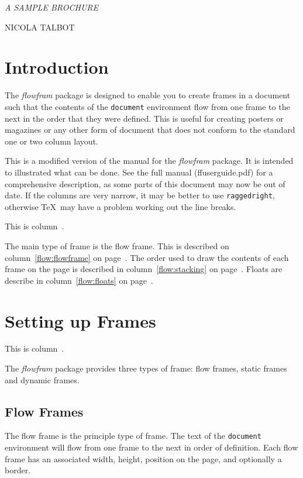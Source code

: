 \documentclass[a4paper]{report}
\newcommand{\env}[1]{\texttt{#1}}
\newcommand{\cmdname}[1]{\texttt{\symbol{92}#1}}
\begin{document}

{\noindent
\slshape\Huge\MakeUppercase{A Sample Brochure}\par
\vskip0.5in
\noindent\large\MakeUppercase{Nicola Talbot}\\
}

\chapter{Introduction}

The \textsl{flowfram} package is designed to enable you to create
frames in a document such that the
contents of the \env{document} environment flow from one
frame to the next in the order that they were defined.
This is useful for creating posters
or magazines or any other form of document that does not
conform to the standard one or two column layout.

This is a modified version of the manual for the \textsl{flowfram} package.
It is intended to illustrated what can be done. See the full
manual (ffuserguide.pdf) for
a comprehensive description, as some parts of this document
may now be out of date.
If the columns are very narrow, it may be better to
use \cmdname{raggedright}, otherwise \TeX\ may have a
problem working out the line breaks.

This is column~\thedisplayedframe.

The main type of frame is the flow frame. This is described on
column~\ref{flow:flowframe} on page~\pageref{flow:flowframe}.
The order used to draw the contents of each frame on the page
is described in column~\ref{flow:stacking} on
page~\pageref{flow:stacking}. Floats are describe in
column~\ref{flow:floats} on page~\pageref{flow:floats}.

\chapter{Setting up Frames}

This is column~\thedisplayedframe.

The \textsl{flowfram} package provides three types of frame:
{flow frames}, {static
frames} and {dynamic frames}.

\section*{Flow Frames}

The flow frame is the principle type of frame.
The text of the \env{document} environment will flow from
one frame to the next in order of definition. Each
flow frame has an associated width, height,
position on the page, and optionally a border.
\end{document}
